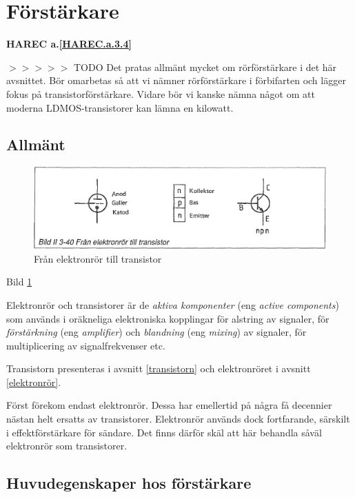 \section{Förstärkare}
\textbf{HAREC a.\ref{HAREC.a.3.4}\label{myHAREC.a.3.4}}

$>>>>>$ TODO Det pratas allmänt mycket om rörförstärkare i det här avsnittet.
Bör omarbetas så att vi nämner rörförstärkare i förbifarten och lägger fokus på
transistorförstärkare. Vidare bör vi kanske nämna något om att moderna
LDMOS-transistorer kan lämna en kilowatt.

\subsection{Allmänt}

\begin{figure}
\includegraphics[width=\textwidth]{images/bild_2_3-40}
\caption{Från elektronrör till transistor}
\label{fig:BildII3-40}
\end{figure}

Bild \ref{fig:BildII3-40}

Elektronrör och transistorer är de \emph{aktiva komponenter} (eng
\emph{active components}) som används i oräkneliga elektroniska kopplingar för
alstring av signaler, för \emph{förstärkning} (eng \emph{amplifier}) och
\emph{blandning} (eng \emph{mixing}) av signaler, för multiplicering av
signalfrekvenser etc. 

Transistorn presenteras i avsnitt \ref{transistorn} och elektronröret i avsnitt \ref{elektronrör}.

\begin{rev-omarbetas}
Först förekom endast elektronrör. Dessa har emellertid på några få
decennier nästan helt ersatts av transistorer. Elektronrör används
dock fortfarande, särskilt i effektförstärkare för sändare. Det finns
därför skäl att här behandla såväl elektronrör som transistorer.
\end{rev-omarbetas}

\subsection{Huvudegenskaper hos förstärkare}
